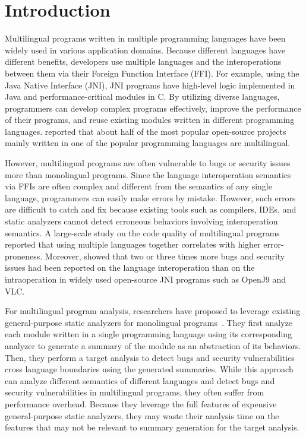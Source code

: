 \section{Introduction}
Multilingual programs written in multiple programming languages
have been widely used in various application domains.
Because different languages have different benefits,
developers use multiple languages and the interoperations between them
via their Foreign Function Interface (FFI). For example, using the Java Native Interface (JNI),
JNI programs have high-level logic implemented in Java and performance-critical
modules in C. By utilizing diverse languages, programmers can
develop complex programs effectively, improve the performance of their
programs, and reuse existing modules written in different programming languages.
\citet{kochhar2016large} reported that about half of the most popular open-source
projects mainly written in one of the popular programming languages are
multilingual.

However, multilingual programs are often vulnerable to bugs or security issues
more than monolingual programs. Since the language interoperation semantics
via FFIs are often complex and different from the semantics of any
single language, programmers can easily make errors by mistake.
However, such errors are difficult to catch and fix because existing
tools such as compilers, IDEs, and static analyzers cannot detect erroneous
behaviors involving interoperation semantics.
A large-scale study on the code quality of multilingual programs~\cite{kochhar2016large}
reported that using multiple languages together correlates with higher error-proneness.  
Moreover, \citet{grichi2020impact} showed that two or three times more
bugs and security issues had been reported on the language
interoperation than on the intraoperation in widely used open-source JNI
programs such as OpenJ9 and VLC.

For multilingual program analysis, researchers have proposed to
leverage existing general-purpose static analyzers for monolingual
programs~\cite{JN-SAF, LeeASE20}.  They first analyze each module
written in a single programming language using its corresponding analyzer to generate
a summary of the module as an abstraction of its behaviors.  Then, they perform a target
analysis to detect bugs and security vulnerabilities cross language boundaries
using the generated summaries.  While this approach can analyze different
semantics of different languages and detect bugs and security vulnerabilities
in multilingual programs, they often suffer from performance overhead.
Because they leverage the full features of expensive general-purpose static analyzers,
they may waste their analysis time on the features that may not be relevant to
summary generation for the target analysis.

